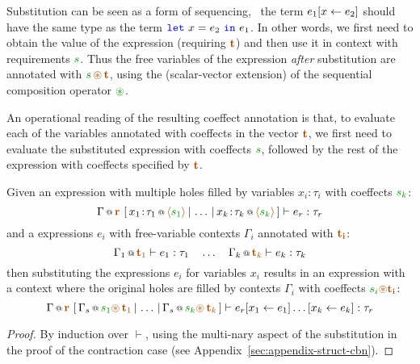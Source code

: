 Substitution can be seen as a form of sequencing, \ie~the term $e_1[x \leftarrow e_2]$ should have
the same type as the term $\kvd{let}~x=e_2~\kvd{in}~e_1$. In other words, we first need to obtain the 
value of the expression (requiring $\aclrd{\textbf{t}}$) and then use it in context with 
requirements $\cclrd{s}$. Thus the free variables of the expression \emph{after} substitution
are annotated with $\cclrd{s} \,\aseq\, \aclrd{\textbf{t}}$, using the (scalar-vector extension)
of the sequential composition operator $\cseq$. 

An operational reading of the resulting coeffect annotation is that, to evaluate each of the variables
annotated with coeffects in the vector $\aclrd{\textbf{t}}$, we first need to evaluate the substituted
expression with coeffects $\cclrd{s}$, followed by the rest of the expression with coeffects specified
by $\aclrd{\textbf{t}}$.

\begin{lemma}
\label{thm:structural-substitution}
Given an expression with multiple holes filled by variables $x_i\!:\!\tau_i$ with coeffects $\cclrd{s_k}$:
%
\begin{equation*}
\coctx{\Gamma}{\aclrd{\textbf{r}}}~[\,\coctx{x_1\!:\!\tau_1}{\alift{\cclrd{s_1}}} \,|\, \ldots \,|\,
  \coctx{x_k\!:\!\tau_k}{\alift{\cclrd{s_k}}}\,] \vdash e_r : \tau_r
\end{equation*}
%
and a expressions $e_i$ with free-variable contexts $\Gamma_i$ annotated with $\aclrd{\mathbf{t_i}}$:
%
\begin{equation*}
\coctx{\Gamma_1}{\aclrd{\textbf{t}_1}} \vdash e_1 : \tau_1 
\quad \ldots \quad
\coctx{\Gamma_k}{\aclrd{\textbf{t}_k}} \vdash e_k : \tau_k
\end{equation*}
%
then substituting the expressions $e_i$ for variables $x_i$ results in an expression with a context
where the original holes are filled by contexts $\Gamma_i$ with coeffects $\cclrd{s_i} \aseq \aclrd{\mathbf{t_i}}$:
%
\begin{equation*}
\coctx{\Gamma}{\aclrd{\textbf{r}}}~[\,\coctx{\Gamma_s}{\cclrd{s_1}\aseq\,\aclrd{\textbf{t}_1}} \,|\, \ldots \,|\, 
  \coctx{\Gamma_s}{\cclrd{s_k}\aseq\,\aclrd{\textbf{t}_k}}\,] \vdash \subst{\subst{e_r}{x_1}{e_1}\ldots}{x_k}{e_k} : \tau_r
\end{equation*}
\end{lemma}
\begin{proof}
By induction over $\vdash$, using the multi-nary aspect of the substitution 
in the proof of the contraction case (see Appendix~\ref{sec:appendix-struct-cbn}).
\end{proof}

